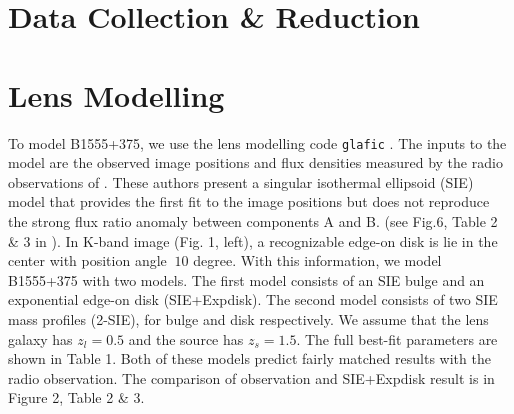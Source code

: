 \documentclass[manuscript]{emulateapj}
\begin{document}
\section{Data Collection \& Reduction}

\section{Lens Modelling}
To model B1555+375, we use the lens modelling code {\tt glafic}
\citep{Oguri}.  The inputs to the model are the observed image positions
and flux densities measured by the radio observations of \citet{Marlow}.
These authors present a singular isothermal ellipsoid (SIE) model that
provides the first fit to the image positions but
does not reproduce the strong flux ratio anomaly between components A and B.
(see Fig.6, Table 2 \& 3 in \citet{Marlow}). In K-band
image (Fig. 1, left), a recognizable edge-on disk is lie in the center
with position angle $~10$ degree. With this information, we model
B1555+375 with two models. The first model consists of an SIE bulge
and an exponential edge-on disk (SIE+Expdisk). The second model
consists of two SIE mass profiles (2-SIE), for bulge and disk
respectively. We assume that the lens galaxy has $z_{l}=0.5$ and the source has $z_s=1.5$. The full best-fit parameters are shown in Table 1. Both
of these models predict fairly matched results with the radio
observation. The comparison of observation and SIE+Expdisk result is
in Figure 2, Table 2 \& 3.



%
\end{document}
